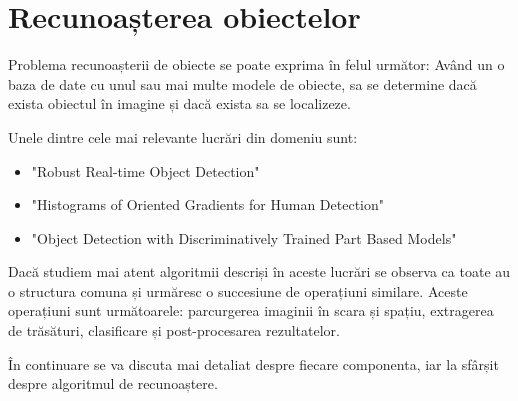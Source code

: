 \chapter{Recunoașterea obiectelor}




Problema recunoașterii de obiecte se poate exprima în felul următor: Având un o baza de date cu unul sau mai multe modele de obiecte, sa se determine dacă exista obiectul în imagine și dacă exista sa se localizeze.

Unele dintre cele mai relevante lucrări din domeniu sunt: 
\begin{itemize}
	\item "Robust Real-time Object Detection" \cite{Viola01robustreal-time}
	\item "Histograms of Oriented Gradients for Human Detection" \cite{Dalal05histogramsof}
	\item "Object Detection with Discriminatively Trained Part Based Models" \cite{Felzenszwalb_objectdetection}
\end{itemize}

Dacă studiem mai atent algoritmii descriși în aceste lucrări se observa ca toate au o structura comuna și urmăresc o succesiune de operațiuni similare.
Aceste operațiuni sunt următoarele: parcurgerea imaginii în scara și spațiu, extragerea de trăsături, clasificare și post-procesarea rezultatelor.

În continuare se va discuta mai detaliat despre fiecare componenta, iar la sfârșit despre algoritmul de recunoaștere.

